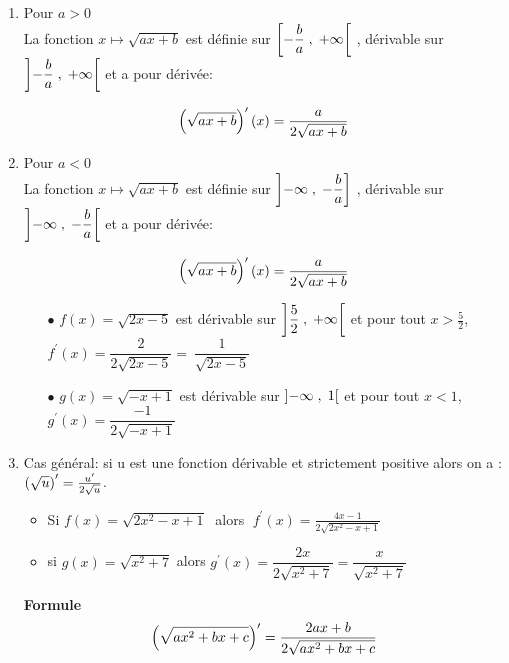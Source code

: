 \begin{corollary}
\begin{enumerate}
\item  Pour $ a>0 $\\
 La fonction \; $ x\longmapsto \sqrt{ax+b} $ \; est  définie sur  $ \left[-\dfrac{b}{a} \;,\; +\infty\right[ $ ,  dérivable sur $ \left]-\dfrac{b}{a} \;,\; +\infty\right[ $ et a pour dérivée:
 
 \[  \left(\sqrt{ax+b}\right)^{\prime}(x)=\dfrac{a}{2\sqrt{ax+b}} \]
 
\item  Pour $ a<0 $\\
 La fonction \; $ x\longmapsto \sqrt{ax+b} $ \; est  définie sur  $ \left]-\infty \;, \;-\dfrac{b}{a}\right] $ ,  dérivable sur $ \left]-\infty \;,\; -\dfrac{b}{a}\right[ $ et a pour dérivée:
 
 \[ \left(\sqrt{ax+b}\right)^{\prime}(x)=\dfrac{a}{2\sqrt{ax+b}} \]


\begin{example}
\begin{itemize}
\item[$  \bullet$] $ f(x)=\sqrt{2x-5} $ est dérivable sur   $ \left]\dfrac{5}{2} \;,\; +\infty\right[ $ et pour tout $ x> \frac{5}{2} $,\;                                                                $  f^{\prime}(x)= \dfrac{2}{2\sqrt{2x-5}}=~\dfrac{1}{\sqrt{2x-5}}$\\
\item[$  \bullet$]$ g(x)=\sqrt{-x+1} $ est dérivable sur   $ \left]-\infty \;,\; 1\right[ $ et pour tout $ x< 1 $,\;  $  g^{\prime}(x)= \dfrac{-1}{2\sqrt{-x+1}}$
\end{itemize}
\end{example}

\item Cas général: si u est une fonction dérivable et strictement positive alors on a :\; $ \left(\sqrt{u}\right)^{\prime}=\frac{u^{\prime}}{2\sqrt{u}} $.
\begin{example}
\begin{itemize}
\item  Si $ f(x)=\sqrt{2x^{2}-x+1}\; $  alors  $ \; f^{\prime}(x)= \frac{4x-1}{2\sqrt{2x^{2}-x+1}}$\\
\item  si $ g(x)=\sqrt{x^{2}+7} $ \; alors \;  $ g^{\prime}(x)= \dfrac{2x}{2\sqrt{x^{2}+7}}= \dfrac{x}{\sqrt{x^{2}+7}}$
\end{itemize}

\end{example}

\textbf{Formule}
\[  \left(\sqrt{ax^{2}+bx+c}\right)^{\prime}=\dfrac{2ax+b}{2\sqrt{ax^{2}+bx+c}}\]



\end{enumerate}
\end{corollary}
